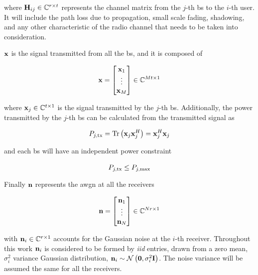 \noindent
where $\mathbf{H}_{ij} \in \mathbb{C}^{r \times t}$ represents the channel matrix from the
$j$-th \gls{bs} to the $i$-th user. It will include the path loss due to
propagation, small scale fading, shadowing, and any other characteristic of
the radio channel that needs to be taken into consideration.

$\mathbf{x}$ is the signal transmitted from all the \gls{bs}, and it is composed of

\begin{equation} \label{eq:generic_tx_signal}
    \mathbf{x} = \begin{bmatrix}
        \mathbf{x}_1 \\
        \vdots \\
        \mathbf{x}_M
    \end{bmatrix} \in \mathbb{C}^{Mt \times 1}
\end{equation}

\noindent
where $\mathbf{x}_j \in \mathbb{C}^{t \times 1}$ is the signal transmitted by the $j$-th
\gls{bs}. Additionally, the power transmitted by the $j$-th \gls{bs} can be
calculated from the transmitted signal as

\begin{equation} \label{eq:bs_tx_power}
P_{j,\text{tx}} = \operatorname*{Tr} \left(\mathbf{x}_j \mathbf{x}_j^H\right) = \mathbf{x}_j^H \mathbf{x}_j
\end{equation}

\noindent
and each \gls{bs} will have an independent power constraint

\begin{equation} \label{eq:pbpc}
    P_{j,\text{tx}} \leq P_{j, \max}
\end{equation}

Finally $\mathbf{n}$ represents the \gls{awgn} at all the receivers

\begin{equation} \label{eq:generic_noise}
    \mathbf{n} = \begin{bmatrix}
        \mathbf{n}_1 \\
        \vdots \\
        \mathbf{n}_N
    \end{bmatrix} \in \mathbb{C}^{Nr \times 1}
\end{equation}

\noindent
with $\mathbf{n}_i \in \mathbb{C}^{r \times 1}$ accounts for the Gaussian noise at the $i$-th
receiver. Throughout this work $\mathbf{n}_i$ is considered to be formed by \emph{iid}
entries, drawn from a zero mean, $\sigma_i^2$ variance Gaussian distribution,
$\mathbf{n}_i \sim \mathcal{N}\left(\mathbf{0}, \sigma_i^2 \mathbf{I}\right)$. The noise variance
will be assumed the same for all the receivers.

